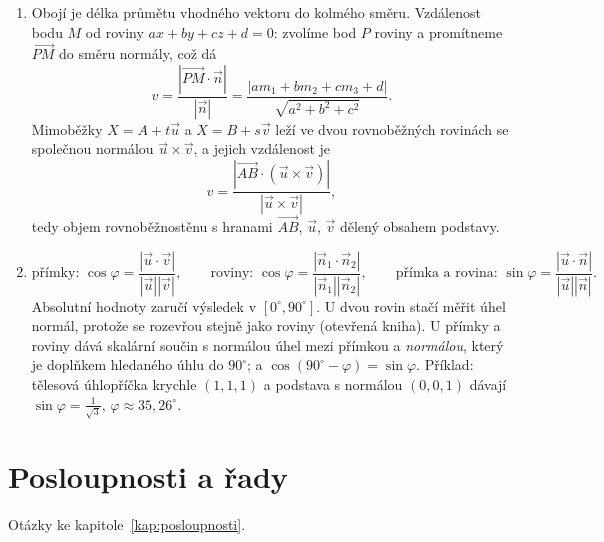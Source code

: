 \begin{enumerate}[label=\textbf{\arabic*.}, leftmargin=*, itemsep=0.8em]
  \item {}
  Obojí je délka průmětu vhodného vektoru do kolmého směru. Vzdálenost bodu $M$ od roviny $ax + by + cz + d = 0$: zvolíme bod $P$ roviny a promítneme $\overrightarrow{PM}$ do směru normály, což dá
  \begin{equation*}
    v = \frac{|\overrightarrow{PM}\cdot\vec{n}|}{|\vec{n}|} = \frac{|am_1 + bm_2 + cm_3 + d|}{\sqrt{a^2 + b^2 + c^2}}.
  \end{equation*}
  Mimoběžky $X = A + t\vec{u}$ a $X = B + s\vec{v}$ leží ve dvou rovnoběžných rovinách se společnou normálou $\vec{u}\times\vec{v}$, a jejich vzdálenost je
  \begin{equation*}
    v = \frac{|\overrightarrow{AB}\cdot(\vec{u}\times\vec{v})|}{|\vec{u}\times\vec{v}|},
  \end{equation*}
  tedy objem rovnoběžnostěnu s hranami $\overrightarrow{AB}$, $\vec{u}$, $\vec{v}$ dělený obsahem podstavy. 

  \item {}
  \begin{equation*}
    \text{přímky: } \cos\varphi = \frac{|\vec{u}\cdot\vec{v}|}{|\vec{u}||\vec{v}|}, \qquad \text{roviny: } \cos\varphi = \frac{|\vec{n}_1\cdot\vec{n}_2|}{|\vec{n}_1||\vec{n}_2|}, \qquad \text{přímka a rovina: } \sin\varphi = \frac{|\vec{u}\cdot\vec{n}|}{|\vec{u}||\vec{n}|}.
  \end{equation*}
  Absolutní hodnoty zaručí výsledek v $[0^\circ, 90^\circ]$. U dvou rovin stačí měřit úhel normál, protože se rozevřou stejně jako roviny (otevřená kniha). U přímky a roviny dává skalární součin s normálou úhel mezi přímkou a \emph{normálou}, který je doplňkem hledaného úhlu do $90^\circ$; a $\cos(90^\circ - \varphi) = \sin\varphi$. Příklad: tělesová úhlopříčka krychle $(1, 1, 1)$ a podstava s normálou $(0, 0, 1)$ dávají $\sin\varphi = \frac{1}{\sqrt{3}}$, $\varphi\approx 35{,}26^\circ$. 
\end{enumerate}

\section{Posloupnosti a řady}

Otázky ke kapitole~\ref{kap:posloupnosti}.

